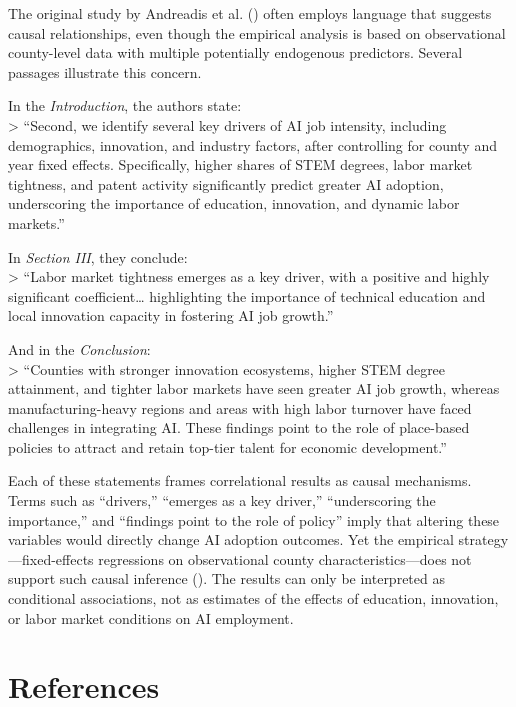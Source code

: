 \documentclass[
]{article}
\begin{document}
The original study by Andreadis et al.
() often employs language that
suggests causal relationships, even though the empirical analysis is
based on observational county-level data with multiple potentially
endogenous predictors. Several passages illustrate this concern.

In the \emph{Introduction}, the authors state:\\
\textgreater{} ``Second, we identify several key drivers of AI job
intensity, including demographics, innovation, and industry factors,
after controlling for county and year fixed effects. Specifically,
higher shares of STEM degrees, labor market tightness, and patent
activity significantly predict greater AI adoption, underscoring the
importance of education, innovation, and dynamic labor markets.''

In \emph{Section III}, they conclude:\\
\textgreater{} ``Labor market tightness emerges as a key driver, with a
positive and highly significant coefficient\ldots{} highlighting the
importance of technical education and local innovation capacity in
fostering AI job growth.''

And in the \emph{Conclusion}:\\
\textgreater{} ``Counties with stronger innovation ecosystems, higher
STEM degree attainment, and tighter labor markets have seen greater AI
job growth, whereas manufacturing-heavy regions and areas with high
labor turnover have faced challenges in integrating AI. These findings
point to the role of place-based policies to attract and retain top-tier
talent for economic development.''

Each of these statements frames correlational results as causal
mechanisms. Terms such as ``drivers,'' ``emerges as a key driver,''
``underscoring the importance,'' and ``findings point to the role of
policy'' imply that altering these variables would directly change AI
adoption outcomes. Yet the empirical strategy---fixed-effects
regressions on observational county characteristics---does not support
such causal inference (). The
results can only be interpreted as conditional associations, not as
estimates of the effects of education, innovation, or labor market
conditions on AI employment.

\section*{References}\label{references}
\end{document}
